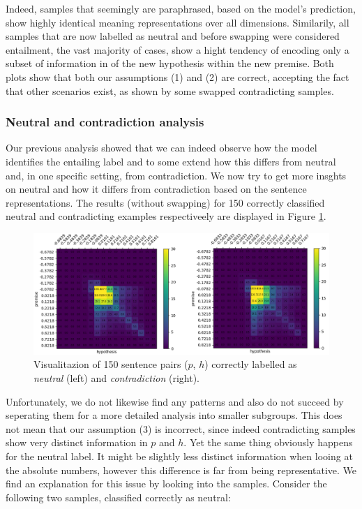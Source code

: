 Indeed, samples that seemingly are paraphrased, based on the model's prediction, show highly identical meaning representations over all dimensions. Similarily, all samples that are now labelled as neutral and before swapping were considered entailment, the vast majority of cases, show a hight tendency of encoding only a subset of information in of the new hypothesis within the new premise. Both plots show that both our assumptions (1) and (2) are correct, accepting the fact that other scenarios exist, as shown by some swapped contradicting samples.
\subsubsection{Neutral and contradiction analysis}
Our previous analysis showed that we can indeed observe how the model identifies the entailing label and to some extend how this differs from neutral and, in one specific setting, from contradiction. We now try to get more insghts on neutral and how it differs from contradiction based on the sentence representations. The results (without swapping) for 150 correctly classified neutral and contradicting examples respectiveely are displayed in Figure \ref{fig:neutr_contr_uninversed}.
\begin{figure}[tph!]	\centering
\includegraphics[totalheight=7cm]{fig/neutr_contr_uninversed.png}
	\caption{Visualitazion of 150 sentence pairs ($p$, $h$) correctly labelled as \textit{neutral} (left) and \textit{contradiction} (right).}
	\label{fig:neutr_contr_uninversed}
\end{figure} 
Unfortunately, we do not likewise find any patterns and also do not succeed by seperating them for a more detailed analysis into smaller subgroups. This does not mean that our assumption (3) is incorrect, since indeed contradicting samples show very distinct information in $p$ and $h$. Yet the same thing obviously happens for the neutral label. It  might be slightly less distinct information when looing at the absolute numbers, however this difference is far from being representative. We find an explanation for this issue by looking into the samples. Consider the following two samples, classified correctly as neutral:
